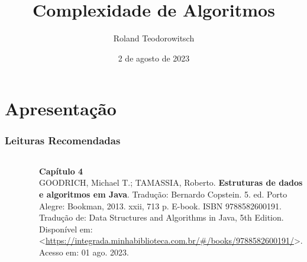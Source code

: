 \documentclass[aspectratio=169]{beamer}
\title[\sc{Complexidade de Algoritmos}]{Complexidade de Algoritmos}
\author[Roland Teodorowitsch]{Roland Teodorowitsch}
\institute[ALEST I - EP - PUCRS]{Algoritmos e Estruturas de Dados I - Escola Politécnica - PUCRS}
\date{2	 de agosto de 2023}
\begin{document}
\justifying

\begin{frame}
	\titlepage
\end{frame}

\section{Apresentação}

\begin{frame}\frametitle{Leituras Recomendadas}

\begin{columns}[T]
\begin{column}{0.15\linewidth}
\vspace{-3mm}
\begin{figure}[h]
	\centering
	\includegraphics[height=0.3\paperheight]{pucrs-ec-poo-unidade_01-complexidade_de_algoritmos-laminas-livro_goodrich.jpg}
\end{figure}
\end{column}
\begin{column}{0.85\linewidth}
\vspace{3mm}
\textbf{Capítulo 4}\\
\scriptsize{GOODRICH, Michael T.; TAMASSIA, Roberto. \textbf{Estruturas de dados e algoritmos em Java}. Tradução: Bernardo Copstein. 5. ed. Porto Alegre: Bookman, 2013. xxii, 713 p. E-book. ISBN 9788582600191. Tradução de: Data Structures and Algorithms in Java, 5th Edition. Disponível em: \textless{}\url{https://integrada.minhabiblioteca.com.br/\#/books/9788582600191/}\textgreater{}. Acesso em: 01 ago. 2023.}
\end{column}
\end{columns}

\vspace{5mm}


\end{frame}
\end{document}
